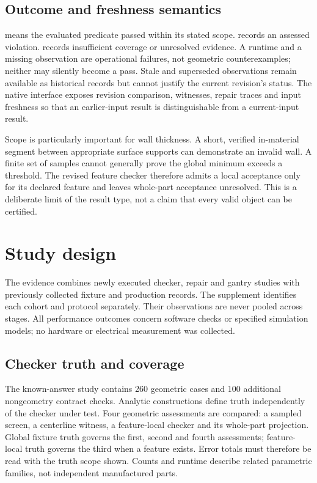 \subsection{Outcome and freshness semantics}
 means the evaluated predicate passed within its stated scope.  records an assessed violation.  records insufficient coverage or unresolved evidence. A runtime  and a missing observation are operational failures, not geometric counterexamples; neither may silently become a pass. Stale and superseded observations remain available as historical records but cannot justify the current revision's status. The native interface exposes revision comparison, witnesses, repair traces and input freshness so that an earlier-input result is distinguishable from a current-input result.

Scope is particularly important for wall thickness. A short, verified in-material segment between appropriate surface supports can demonstrate an invalid wall. A finite set of samples cannot generally prove the global minimum exceeds a threshold. The revised feature checker therefore admits a local acceptance only for its declared feature and leaves whole-part acceptance unresolved. This is a deliberate limit of the result type, not a claim that every valid object can be certified.

\section{Study design}
The evidence combines newly executed checker, repair and gantry studies with previously collected fixture and production records. The supplement identifies each cohort and protocol separately. Their observations are never pooled across stages. All performance outcomes concern software checks or specified simulation models; no hardware or electrical measurement was collected.

\subsection{Checker truth and coverage}
The known-answer study contains 260 geometric cases and 100 additional nongeometry contract checks. Analytic constructions define truth independently of the checker under test. Four geometric assessments are compared: a sampled screen, a centerline witness, a feature-local checker and its whole-part projection. Global fixture truth governs the first, second and fourth assessments; feature-local truth governs the third when a feature exists. Error totals must therefore be read with the truth scope shown. Counts and runtime describe related parametric families, not independent manufactured parts.

